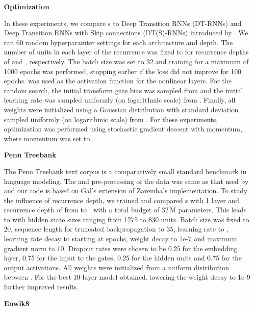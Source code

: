 \documentclass[letterpaper]{article}
\begin{document}
\textbf{Optimization}

In these experiments, we compare \arch{}s to Deep Transition RNNs (DT-RNNs) and Deep Transition RNNs with Skip connections (DT(S)-RNNs) introduced by \citet{pascanu}. 
We ran 60 random hyperparamter settings for each architecture and depth.
The number of units in each layer of the recurrence was fixed to  for recurrence depths of  and , respectively.
The batch size was set to 32 and training for a maximum of 1000 epochs was performed, stopping earlier if the loss did not improve for 100 epochs. 
 was used as the activation function for the nonlinear layers.
For the random search, the initial transform gate bias was sampled from  and the initial learning rate was sampled uniformly (on logarithmic scale) from . 
Finally, all weights were initialized using a Gaussian distribution with standard deviation sampled uniformly (on logarithmic scale) from . 
For these experiments, optimization was performed using stochastic gradient descent with momentum, where momentum was set to .

\textbf{Penn Treebank}


The Penn Treebank text corpus \citep{penntreebank} is a comparatively small standard benchmark in language modeling. 
The and pre-processing of the data was same as that used by \citet{gal2015} and our code is based on Gal's \citep{gal2015} extension of Zaremba's \citep{zaremba} implementation.
To study the influence of recurrence depth, we trained and compared \arch{}s with 1 layer and recurrence depth of from  to . with a total budget of 32\,M parameters.
This leads to \arch{} with hidden state sizes ranging from 1275 to 830 units. Batch size was fixed to 20, sequence length for truncated backpropagation to 35, learning rate to , learning rate decay to  starting at  epochs, weight decay to 1e-7 and maximum gradient norm to 10.
Dropout rates were chosen to be 0.25 for the embedding layer, 0.75 for the input to the gates, 0.25 for the hidden units and 0.75 for the output activations. All weights were initialized from a uniform distribution between .
For the best 10-layer model obtained, lowering the weight decay to 1e-9 further improved results.

\textbf{Enwik8}
\end{document}
